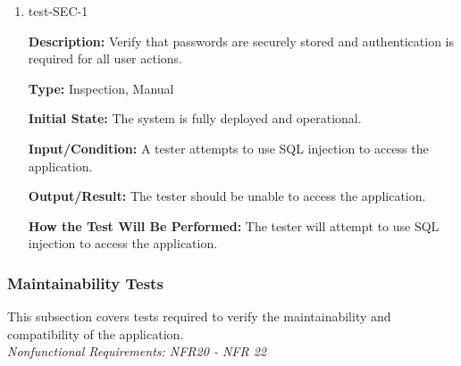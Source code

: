 \documentclass[12pt, titlepage]{article}
\begin{document}
\begin{enumerate}

\item{test-SEC-1\\}

\textbf{Description:} Verify that passwords are securely stored and
authentication is required for all user actions.

\textbf{Type:} Inspection, Manual
					
\textbf{Initial State:} The system is fully deployed and operational.
					
\textbf{Input/Condition:} A tester attempts to use SQL injection to access
the application.
					
\textbf{Output/Result:} The tester should be unable to access the application.
					
\textbf{How the Test Will Be Performed:} The tester will attempt to use SQL
injection to access the application.

\end{enumerate}

\subsubsection{Maintainability Tests}

This subsection covers tests required to verify the maintainability and compatibility of the application. \\
\textit{Nonfunctional Requirements: NFR20 - NFR 22}
\end{document}
